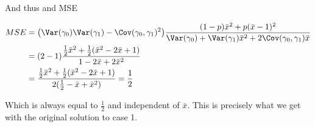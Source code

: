 And thus and MSE

\begin{align*}
	MSE &= \big(\Var(\gamma_0) \Var(\gamma_1) - \Cov(\gamma_0, \gamma_1)^2 \big)\frac{(1 - p) \bar{x}^2  + p(\bar{x} - 1)^2 }{\Var(\gamma_0) + \Var(\gamma_1) \bar{x}^2 + 2 \Cov(\gamma_0, \gamma_1) \bar{x}} \\
		&= (2 - 1)\frac{\frac{1}{2} \bar{x}^2 + \frac{1}{2}(\bar{x}^2 - 2 \bar{x} + 1)}{1 - 2 \bar{x} + 2 \bar{x}^2} \\
		&= \frac{\frac{1}{2} \bar{x}^2 + \frac{1}{2}(\bar{x}^2 - 2\bar{x} + 1)}{2(\frac{1}{2} -  \bar{x} + \bar{x}^2)} = \frac{1}{2}
\end{align*} 

Which is always equal to $\frac{1}{2}$ and independent of $\bar{x}$. This is precisely what we get with the original solution to case 1.
